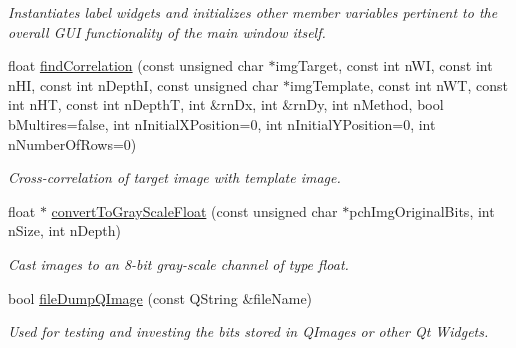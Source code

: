 \begin{CompactItemize}
\begin{CompactList}\small\item\em Instantiates label widgets and initializes other member variables pertinent to the overall GUI functionality of the main window itself. \item\end{CompactList}\item 
float \hyperlink{classQcorr_05dcc1b0be4596b355df235264180da4}{findCorrelation} (const unsigned char $\ast$imgTarget, const int nWI, const int nHI, const int nDepthI, const unsigned char $\ast$imgTemplate, const int nWT, const int nHT, const int nDepthT, int \&rnDx, int \&rnDy, int nMethod, bool bMultires=false, int nInitialXPosition=0, int nInitialYPosition=0, int nNumberOfRows=0)
\begin{CompactList}\small\item\em Cross-correlation of target image with template image. \item\end{CompactList}\item 
float $\ast$ \hyperlink{classQcorr_d1b26ace597c0c4a0f64a0bd9576d4fc}{convertToGrayScaleFloat} (const unsigned char $\ast$pchImgOriginalBits, int nSize, int nDepth)
\begin{CompactList}\small\item\em Cast images to an 8-bit gray-scale channel of type float. \item\end{CompactList}\item 
bool \hyperlink{classQcorr_87229fc918fa4011e96fbadb325fd52e}{fileDumpQImage} (const QString \&fileName)
\begin{CompactList}\small\item\em Used for testing and investing the bits stored in QImages or other Qt Widgets. \item\end{CompactList}\end{CompactItemize}
